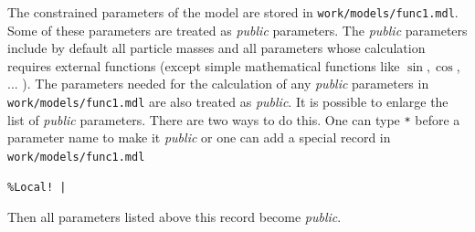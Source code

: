\documentclass[12pt,a4paper]{article}
\begin{document}
The constrained parameters of the model are stored in \verb|work/models/func1.mdl|. Some of
these parameters are treated as {\it public} parameters. The {\it public} parameters include 
by default all particle masses 
and all parameters  whose calculation requires external functions (except simple
mathematical functions like $\sin,\cos$, ... ). The parameters needed for the calculation of any 
{\it public} parameters in  \verb|work/models/func1.mdl|
are also treated as {\it public}. 
It is possible to enlarge the list of {\it public} parameters. There are two ways to do this. 
One can type \verb|*| before a parameter name to make it {\it public} or one 
can add a  special record in \verb|work/models/func1.mdl|
\begin{verbatim}
%Local! |   
\end{verbatim}
Then all parameters listed above this record  become {\it public}. 
\end{document}
